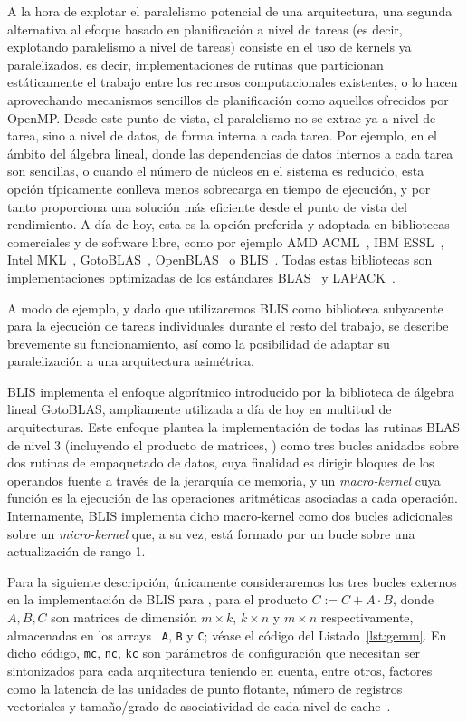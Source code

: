 A la hora de explotar el paralelismo potencial de una arquitectura, una
segunda alternativa al efoque basado en planificación a nivel de tareas (es
decir, explotando paralelismo a nivel de tareas) consiste en el uso de
kernels ya paralelizados, es decir, implementaciones de rutinas que
particionan estáticamente el trabajo entre los recursos computacionales
existentes, o lo hacen aprovechando mecanismos sencillos de planificación
como aquellos ofrecidos por OpenMP. Desde este punto de vista, el
paralelismo no se extrae ya a nivel de tarea, sino a nivel de datos, de
forma interna a cada tarea. Por ejemplo, en el ámbito del álgebra lineal,
donde las dependencias de datos internos a cada tarea son sencillas, o
cuando el número de núcleos en el sistema es reducido, esta opción
típicamente conlleva menos sobrecarga en tiempo de ejecución, y por tanto
proporciona una solución más eficiente desde el punto de vista del
rendimiento. A día de hoy, esta es la opción preferida y adoptada en
bibliotecas comerciales y de software libre, como por ejemplo AMD
ACML~\cite{ACML}, IBM ESSL~\cite{ESSL}, Intel MKL~\cite{mkl},
GotoBLAS~\cite{Goto:2008:AHP}, OpenBLAS~\cite{OpenBLAS} o
BLIS~\cite{BLIS1}. Todas estas bibliotecas son implementaciones optimizadas
de los estándares BLAS~\cite{blas1,blas2,blas3} y LAPACK~\cite{lapack}.

A modo de ejemplo, y dado que utilizaremos BLIS como biblioteca subyacente para la ejecución de tareas
individuales durante el resto del trabajo, se describe brevemente su funcionamiento, así como la posibilidad
de adaptar su paralelización a una arquitectura asimétrica.

BLIS implementa el enfoque algorítmico introducido por la biblioteca de álgebra lineal GotoBLAS, ampliamente
utilizada a día de hoy en multitud de arquitecturas. Este enfoque plantea la implementación de todas las rutinas
BLAS de nivel 3 (incluyendo el producto de matrices, \gemm) como tres bucles anidados sobre dos rutinas de 
empaquetado de datos, cuya finalidad es dirigir bloques de los operandos fuente a través de la jerarquía
de memoria, y un {\em macro-kernel} cuya función es la ejecución de las operaciones aritméticas asociadas
a cada operación. Internamente, BLIS implementa dicho macro-kernel como dos bucles adicionales sobre un 
{\em micro-kernel} que, a su vez, está formado por un bucle sobre una actualización de rango 1.

Para la siguiente descripción, únicamente consideraremos los tres bucles
externos en la implementación de BLIS para \gemm, para el producto
$C:=C+A\cdot B$, donde $A,B,C$ son matrices de dimensión $m \times k$,
$k\times n$ y $m \times n$ respectivamente, almacenadas en los arrays {\tt
  A}, {\tt B} y {\tt C}; véase el código del Listado~\ref{lst:gemm}.  En
dicho código, {\tt mc}, {\tt nc}, {\tt kc} son parámetros de configuración
que necesitan ser sintonizados para cada arquitectura teniendo en cuenta,
entre otros, factores como la latencia de las unidades de punto flotante,
número de registros vectoriales y tamaño/grado de asociatividad de cada
nivel de cache~\cite{BLIS4}.


